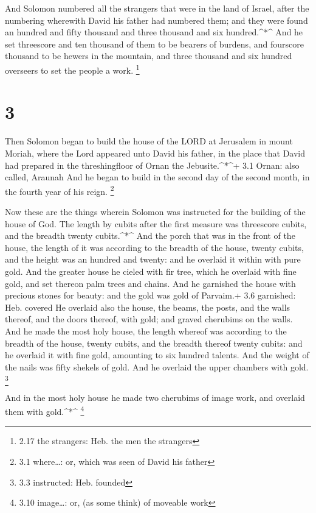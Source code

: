  And Solomon numbered all the strangers that were in the
land of Israel, after the numbering wherewith David his father had
numbered them; and they were found an hundred and fifty thousand and
three thousand and six hundred.\^{}*\^{}  And he set
threescore and ten thousand of them to be bearers of burdens, and
fourscore thousand to be hewers in the mountain, and three thousand and
six hundred overseers to set the people a work. \footnote{2.17 the
  strangers: Heb. the men the strangers}

\hypertarget{section-2}{%
\section{3}\label{section-2}}

 Then Solomon began to build the house of the LORD at
Jerusalem in mount Moriah, where the Lord appeared unto David his
father, in the place that David had prepared in the threshingfloor of
Ornan the Jebusite.\^{}*\^{}+ 3.1 Ornan: also called, Araunah
 And he began to build in the second day of the second
month, in the fourth year of his reign. \footnote{3.1 where\ldots: or,
  which was seen of David his father}

 Now these are the things wherein Solomon was instructed for
the building of the house of God. The length by cubits after the first
measure was threescore cubits, and the breadth twenty cubits.\^{}*\^{}
 And the porch that was in the front of the house, the
length of it was according to the breadth of the house, twenty cubits,
and the height was an hundred and twenty: and he overlaid it within with
pure gold.  And the greater house he cieled with fir tree,
which he overlaid with fine gold, and set thereon palm trees and chains.
 And he garnished the house with precious stones for beauty:
and the gold was gold of Parvaim.+ 3.6 garnished: Heb. covered
 He overlaid also the house, the beams, the posts, and the
walls thereof, and the doors thereof, with gold; and graved cherubims on
the walls.  And he made the most holy house, the length
whereof was according to the breadth of the house, twenty cubits, and
the breadth thereof twenty cubits: and he overlaid it with fine gold,
amounting to six hundred talents.  And the weight of the
nails was fifty shekels of gold. And he overlaid the upper chambers with
gold. \footnote{3.3 instructed: Heb. founded}

 And in the most holy house he made two cherubims of image
work, and overlaid them with gold.\^{}*\^{} \footnote{3.10 image\ldots:
  or, (as some think) of moveable work}

